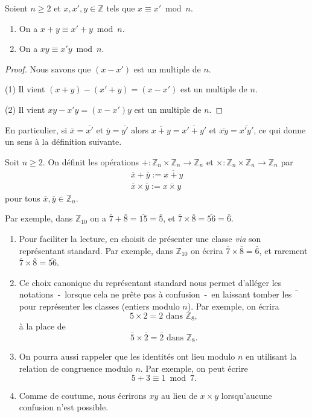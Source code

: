\documentclass[french,course,oneside,theoremnosection]{lecture}
\newcommand{\Z}{\mathbb{Z}}
\begin{document}
\begin{lemma}
Soient $n \geq 2$ et $x,x',y \in \Z$ tels que $x \equiv x' \bmod n$.
\begin{enumerate}[(1)]
\item On a $x+y \equiv x'+y \bmod n$.
\item On a $xy \equiv x'y \bmod n$.
\end{enumerate}
\end{lemma}
\begin{proof}
Nous savons que $(x-x')$ est un multiple de $n$.

(1) Il vient  $(x+y)-(x'+y)=(x-x')$ est un multiple de $n$.

(2) Il vient $xy-x'y=(x-x')y$ est un multiple de $n$.
\end{proof}
En particulier, si $\overline{x}=\overline{x'}$ et $\overline{y}=\overline{y'}$ alors $\overline{x+y}=\overline{x'+y'}$ et $\overline{xy}=\overline{x'y'}$, ce qui donne un sens à la définition suivante.

\begin{definition}
Soit $n\geq 2$. On définit les opérations $+\colon \Z_n\times \Z_n \to \Z_n$ et $\times \colon \Z_n \times \Z_n \to \Z_n$ par
\begin{gather*}
\overline{x}+\overline{y}:=\overline{x+y}\\
\overline{x}\times\overline{y}:=\overline{x\times y}
\end{gather*}
pour tous $\overline{x}, \overline{y}\in \Z_n$.
\end{definition} 

\begin{example}
Par exemple, dans $\Z_{10}$ on a $\overline{7}+\overline{8}=\overline{15}=\overline{5}$, et $\overline{7}\times\overline{8}=\overline{56}=\overline{6}$.
\end{example}

\begin{notation}
\begin{enumerate}
\item Pour faciliter la lecture, en choisit de présenter une classe \emph{via} son représentant standard. Par exemple, dans $\Z_{10}$ on écrira $\overline{7}\times\overline{8}=\overline{6}$, et rarement $\overline{7}\times\overline{8}=\overline{56}$.
\item Ce choix canonique du représentant standard nous permet d'alléger les notations~-~lorsque cela ne prête pas à confusion~-~en laissant tomber les $\overline{\phantom{8}}$ pour représenter les classes (entiers modulo $n$). Par exemple, on écrira
\[
5 \times 2 = 2 \text{ dans } \Z_8,
\]
à la place de 
\[
\overline{5} \times \overline{2} = \overline{2} \text{ dans } \Z_8.
\]
\item On pourra aussi rappeler que les identités ont lieu modulo $n$ en utilisant la relation de congruence modulo $n$. Par exemple, on peut écrire
\[
5+3 \equiv 1 \bmod 7.
\]
\item Comme de coutume, nous écrirons $xy$ au lieu de $x \times y$ lorsqu'aucune confusion n'est possible.
\end{enumerate}
\end{notation}
\end{document}
